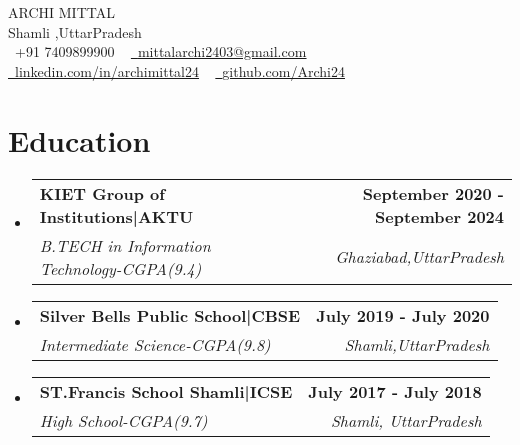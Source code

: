 \documentclass[letterpaper,11pt]{article}
\makeatletter
\newcommand{\resumeSubheading}[4]{
  \vspace{-2pt}\item
    \begin{tabular*}{1.0\textwidth}[t]{l@{\extracolsep{\fill}}r}
      \textbf{#1} & \textbf{\small #2} \\
      \textit{\small#3} & \textit{\small #4} \\
    \end{tabular*}\vspace{-7pt}
}
\newcommand{\resumeSubHeadingListStart}{\begin{itemize}[leftmargin=0.0in, label={}]}
\newcommand{\resumeSubHeadingListEnd}{\end{itemize}}
\makeatother
\begin{document}

\begin{center}
    {\Huge \scshape ARCHI MITTAL} \\ \vspace{1pt}
    Shamli ,UttarPradesh \\ \vspace{1pt}
    \small \raisebox{-0.1\height}\faPhone\ +91 7409899900 ~ \href{mailto:x@gmail.com}{\raisebox{-0.2\height}\faEnvelope\  \underline{mittalarchi2403@gmail.com}} ~ 
    \href{https://linkedin.com/in//}{\raisebox{-0.2\height}\faLinkedin\ \underline{linkedin.com/in/archimittal24}}  ~
    \href{https://github.com/}{\raisebox{-0.2\height}\faGithub\ \underline{github.com/Archi24}}
    \vspace{-8pt}
\end{center}


\section{Education}
  \resumeSubHeadingListStart
    \resumeSubheading
      {KIET Group of Institutions|AKTU}{September 2020 - September 2024}
      {B.TECH in Information Technology-CGPA(9.4)}{Ghaziabad,UttarPradesh}
      \resumeSubheading
      {Silver Bells Public School|CBSE}{July 2019 - July 2020}
      {Intermediate Science-CGPA(9.8)}{Shamli,UttarPradesh}
      \resumeSubheading
      {ST.Francis School Shamli|ICSE}{July 2017 - July 2018}
      {High School-CGPA(9.7)}{Shamli, UttarPradesh}
  \resumeSubHeadingListEnd
\end{document}
